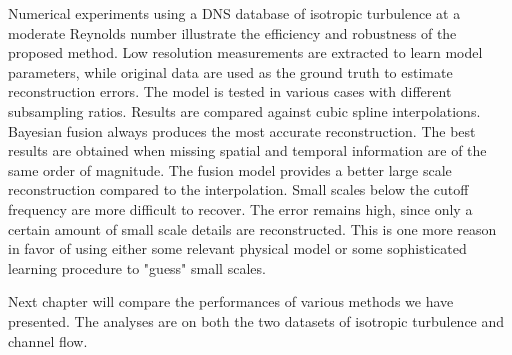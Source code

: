 Numerical experiments using a DNS database of isotropic turbulence at a moderate Reynolds number illustrate the efficiency and robustness of the proposed method. Low resolution measurements are extracted to learn model parameters, while original data are used as the ground truth to estimate reconstruction errors. The model is tested in various cases with different subsampling ratios. Results are compared against cubic spline interpolations. Bayesian fusion always produces the most accurate reconstruction. The best results are obtained when missing spatial and temporal information are of the same order of magnitude. The fusion model provides a better large scale reconstruction compared to the interpolation. Small scales below the cutoff frequency are more difficult to recover. The error remains high, since only a certain amount of small scale details are reconstructed. This is one more reason in favor of using either some relevant physical model or some  sophisticated learning procedure to "guess" small scales.

Next chapter will compare the performances of various methods we have presented. The analyses are on both the two datasets of isotropic turbulence and channel flow. 